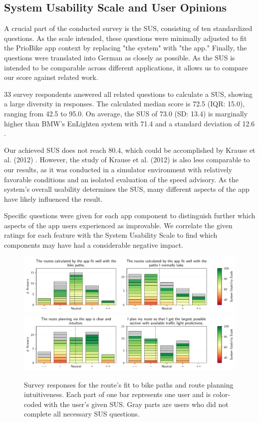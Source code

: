 \subsection{System Usability Scale and User Opinions}

A crucial part of the conducted survey is the SUS, consisting of ten standardized questions. As the scale intended, these questions were minimally adjusted to fit the PrioBike app context by replacing "the system" with "the app." Finally, the questions were translated into German as closely as possible. As the SUS is intended to be comparable across different applications, it allows us to compare our score against related work. 

33 survey respondents answered all related questions to calculate a SUS, showing a large diversity in responses. The calculated median score is 72.5 (IQR: 15.0), ranging from 42.5 to 95.0. On average, the SUS of 73.0 (SD: 13.4) is marginally higher than BMW's EnLighten system with 71.4 and a standard deviation of 12.6 \cite{wilson_driver_2017}. 

Our achieved SUS does not reach 80.4, which could be accomplished by Krause et al. (2012) \cite{krause_traffic_2012}. However, the study of Krause et al. (2012) \cite{krause_traffic_2012} is also less comparable to our results, as it was conducted in a simulator environment with relatively favorable conditions and an isolated evaluation of the speed advisory. As the system's overall usability determines the SUS, many different aspects of the app have likely influenced the result.

Specific questions were given for each app component to distinguish further which aspects of the app users experienced as improvable. We correlate the given ratings for each feature with the System Usability Scale to find which components may have had a considerable negative impact.

\begin{figure}[!b]
\caption{Survey responses for the route's fit to bike paths and route planning intuitiveness. Each part of one bar represents one user and is color-coded with the user's given SUS. Gray parts are users who did not complete all necessary SUS questions.}\label{fig:route-fit-bike-paths}
\includegraphics[width=\linewidth]{images/app-usability-questions-route-fit-bike-paths.pdf}
\\
\includegraphics[width=\linewidth]{images/app-usability-questions-route-planning-intuitiveness.pdf}
\end{figure}

